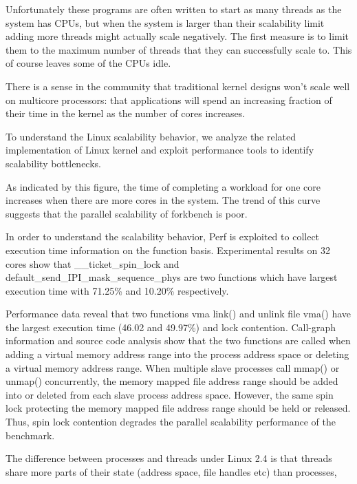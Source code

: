 Unfortunately these programs are often written to start as many threads as the system has CPUs, 
but when the system is larger than their scalability limit adding more threads might actually scale negatively.
The first measure is to limit them to the maximum number of threads that they can successfully scale to.
This of course leaves some of the CPUs idle. 




There is a sense in the community that traditional kernel
designs won’t scale well on multicore processors: that
applications will spend an increasing fraction of their time
in the kernel as the number of cores increases.

To understand the Linux scalability
behavior, we analyze the related implementation of Linux
kernel and exploit performance tools to identify scalability
bottlenecks.


As indicated by this figure, the time of completing
a workload for one core increases when there are more
cores in the system. The trend of this curve suggests that
the parallel scalability of forkbench is poor.

In order to understand the scalability behavior, 
Perf\cite{} is exploited to collect execution time information
on the function basis. 
Experimental results on 32 cores
show that \_\_ticket\_spin\_lock and 
default\_send\_IPI\_mask\_sequence\_phys are two functions 
which have largest execution time with 71.25\% and 10.20\% respectively. 

Performance data reveal that two functions vma link() and
unlink file vma() have the largest execution time (46.02%
and 49.97\%) and lock contention. Call-graph information
and source code analysis show that the two functions are
called when adding a virtual memory address range into the
process address space or deleting a virtual memory address range. 
When multiple slave processes call mmap() or unmap() concurrently, the 
memory mapped file address range should be added into or 
deleted from each slave process address space. However, 
the same spin lock protecting the memory mapped file 
address range should be held or released. Thus, spin lock 
contention degrades the parallel scalability performance of 
the benchmark. 



The difference between processes and threads under Linux 2.4 is that threads share more parts of their state (address space, file handles etc) than processes, 

